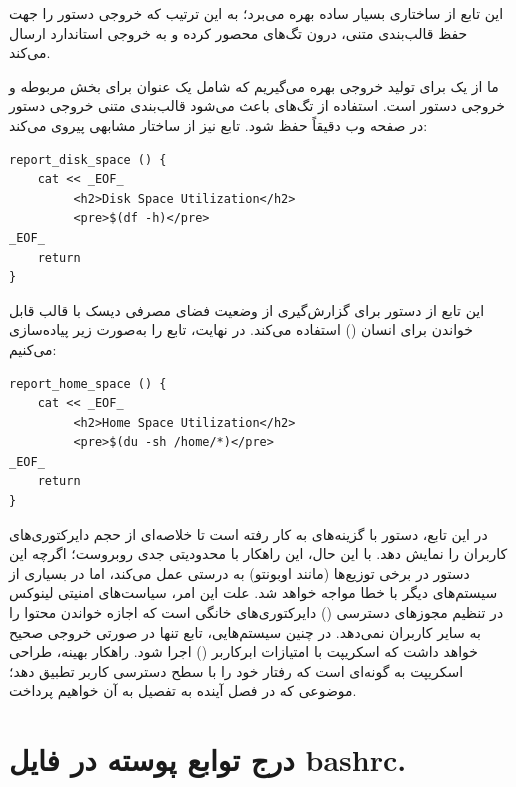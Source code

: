 این تابع از ساختاری بسیار ساده بهره می‌برد؛ به این ترتیب که خروجی دستور  را جهت حفظ قالب‌بندی متنی، درون تگ‌های  محصور کرده و به خروجی استاندارد ارسال می‌کند.

ما از یک  برای تولید خروجی بهره می‌گیریم که شامل یک عنوان برای بخش مربوطه و خروجی دستور  است. استفاده از تگ‌های  باعث می‌شود قالب‌بندی متنی خروجی دستور در صفحه وب دقیقاً حفظ شود. تابع  نیز از ساختار مشابهی پیروی می‌کند:

\begin{latin}
\begin{lstlisting}
report_disk_space () {
    cat << _EOF_
         <h2>Disk Space Utilization</h2>
         <pre>$(df -h)</pre>
_EOF_
    return
}
\end{lstlisting}
\end{latin}

این تابع از دستور  برای گزارش‌گیری از وضعیت فضای مصرفی دیسک با قالب قابل خواندن برای انسان () استفاده می‌کند. در نهایت، تابع  را به‌صورت زیر پیاده‌سازی می‌کنیم:

\begin{latin}
\begin{lstlisting}
report_home_space () {
    cat << _EOF_
         <h2>Home Space Utilization</h2>
         <pre>$(du -sh /home/*)</pre>
_EOF_
    return
}
\end{lstlisting}
\end{latin}

در این تابع، دستور  با گزینه‌های  به کار رفته است تا خلاصه‌ای از حجم دایرکتوری‌های کاربران را نمایش دهد. با این حال، این راهکار با محدودیتی جدی روبروست؛ اگرچه این دستور در برخی توزیع‌ها (مانند اوبونتو) به درستی عمل می‌کند، اما در بسیاری از سیستم‌های دیگر با خطا مواجه خواهد شد. علت این امر، سیاست‌های امنیتی لینوکس در تنظیم مجوزهای دسترسی () دایرکتوری‌های خانگی است که اجازه خواندن محتوا را به سایر کاربران نمی‌دهد. در چنین سیستم‌هایی، تابع  تنها در صورتی خروجی صحیح خواهد داشت که اسکریپت با امتیازات ابرکاربر () اجرا شود. راهکار بهینه، طراحی اسکریپت به گونه‌ای است که رفتار خود را با سطح دسترسی کاربر تطبیق دهد؛ موضوعی که در فصل آینده به تفصیل به آن خواهیم پرداخت.

\section{درج توابع پوسته در فایل bashrc.}

